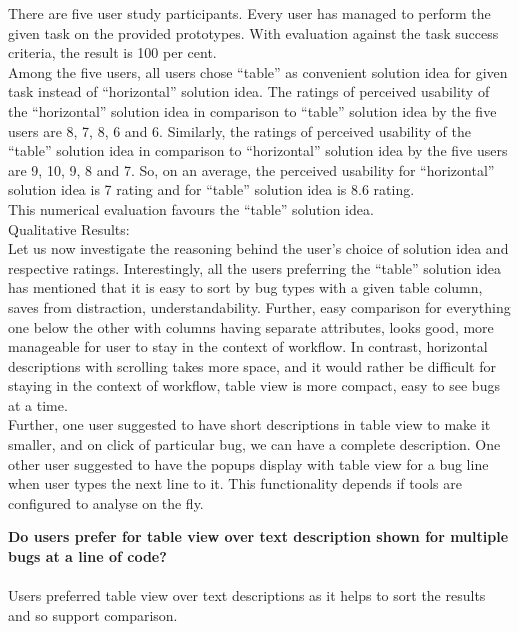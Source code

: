 There are five user study participants. Every user has managed to perform the given task on the provided prototypes. With evaluation against the task success criteria, the result is 100 per cent. \\

Among the five users, all users chose “table” as convenient solution idea for given task instead of “horizontal” solution idea. The ratings of perceived usability of the “horizontal” solution idea in comparison to “table” solution idea by the five users are 8, 7, 8, 6 and 6. Similarly, the ratings of perceived usability of the “table” solution idea in comparison to “horizontal” solution idea by the five users are 9, 10, 9, 8 and 7. So, on an average, the perceived usability for “horizontal” solution idea is 7 rating and for “table” solution idea is 8.6 rating. \\

This numerical evaluation favours the “table” solution idea. \\

Qualitative Results: \\

Let us now investigate the reasoning behind the user’s choice of solution idea and respective ratings. Interestingly, all the users preferring the “table” solution idea has mentioned that it is easy to sort by bug types with a given table column, saves from distraction, understandability. Further, easy comparison for everything one below the other with columns having separate attributes, looks good, more manageable for user to stay in the context of workflow. In contrast, horizontal descriptions with scrolling takes more space, and it would rather be difficult for staying in the context of workflow, table view is more compact, easy to see bugs at a time. \\

Further, one user suggested to have short descriptions in table view to make it smaller, and on click of particular bug, we can have a complete description. One other user suggested to have the popups display with table view for a bug line when user types the next line to it. This functionality depends if tools are configured to analyse on the fly. \\

\begin{myboxi}{{\textbf{Do users prefer for table view over text description shown for multiple bugs at a line of code?}}}
	\\ \\ Users preferred table view over text descriptions as it helps to sort the results and so support comparison. \\
\end{myboxi}

